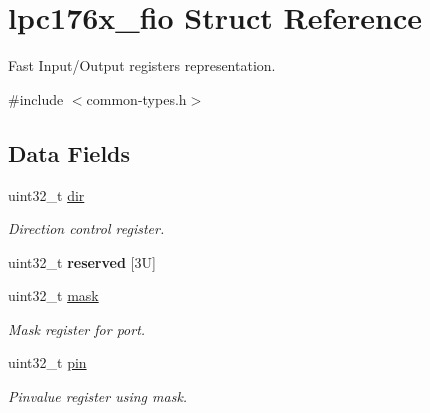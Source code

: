\hypertarget{structlpc176x__fio}{}\section{lpc176x\+\_\+fio Struct Reference}
\label{structlpc176x__fio}


Fast Input/\+Output registers representation.  




{\ttfamily \#include $<$common-\/types.\+h$>$}

\subsection*{Data Fields}
\begin{DoxyCompactItemize}
\item 
\mbox{\label{structlpc176x__fio_a0869e0e729434ac22df5b67f9ea7af86}} 
uint32\+\_\+t \mbox{\hyperlink{structlpc176x__fio_a0869e0e729434ac22df5b67f9ea7af86}{dir}}
\begin{DoxyCompactList}\small\item\em Direction control register. \end{DoxyCompactList}\item 
\mbox{\label{structlpc176x__fio_ac7d96952f296ac66b87e81fb3a9053b4}} 
uint32\+\_\+t {\bfseries reserved} \mbox{[}3\+U\mbox{]}
\item 
\mbox{\label{structlpc176x__fio_af2ed6a06d8c33c4c9c0c48bacf019707}} 
uint32\+\_\+t \mbox{\hyperlink{structlpc176x__fio_af2ed6a06d8c33c4c9c0c48bacf019707}{mask}}
\begin{DoxyCompactList}\small\item\em Mask register for port. \end{DoxyCompactList}\item 
\mbox{\label{structlpc176x__fio_a14fa4bdd6096bcb552316415c6ad9576}} 
uint32\+\_\+t \mbox{\hyperlink{structlpc176x__fio_a14fa4bdd6096bcb552316415c6ad9576}{pin}}
\begin{DoxyCompactList}\small\item\em Pinvalue register using \textquotesingle{}mask\textquotesingle{}. \end{DoxyCompactList}\item 
\mbox{\label{structlpc176x__fio_a5c8a9e1e7eaeaa85db7a64fe9d461fd4}} 

\end{DoxyCompactItemize}
